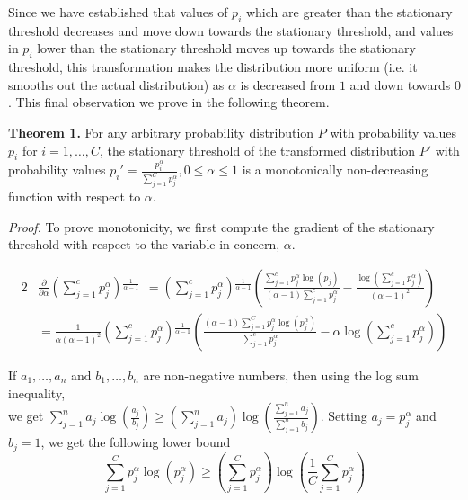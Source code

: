 \documentclass[times,sort&compress]{elsarticle}
\begin{document}
Since we have established that values of $p_i$ which are greater than the stationary
threshold decreases and move down towards the stationary threshold, and values in $p_i$
lower than the stationary threshold moves up towards the stationary threshold, this
transformation makes the distribution more uniform (i.e. it smooths out the actual
distribution) as $\alpha$ is decreased from $1$ and down towards $0$. This final
observation we prove in the following theorem.



\textbf{Theorem 1.} For any arbitrary probability distribution $P$ with probability
values $p_i$ for $i=1,\dots,C$, the stationary threshold of the transformed distribution
$P'$ with probability values $p_i'=\frac{p_i^{\alpha}}{\sum _{j=1}^C p_j^\alpha}, 0 \leq
\alpha \leq 1$ is a monotonically non-decreasing function with respect to $\alpha$.

\textit{Proof.} To prove monotonicity, we first compute the gradient of the stationary
threshold with respect to the variable in concern, $\alpha$.

\begin{alignat}{2} & \frac{\partial }{\partial \alpha} \left(\sum _{j=1}^c
p_j^{\alpha}\right){}^{\frac{1}{\alpha -1}}\ \ = \left(\sum _{j=1}^c
p_j^{\alpha}\right){}^{\frac{1}{\alpha -1}} \left(\frac{\sum _{j=1}^c p_j^{\alpha } \log
\left(p_j\right)}{(\alpha -1) \sum _{j=1}^c p_j^{\alpha}}-\frac{\log \left(\sum _{j=1}^c
p_j^{\alpha}\right)}{(\alpha -1)^2}\right) \\
& = \frac{1}{\alpha  (\alpha -1)^2} \left(\sum _{j=1}^c p_j^{\alpha
}\right){}^{\frac{1}{\alpha -1}} \left(\frac{(\alpha -1) \sum _{j=1}^C p_j^{\alpha }
\log \left(p_j^{\alpha}\right)}{\sum _{j=1}^c p_j^{\alpha }}-\alpha \log \left(\sum
_{j=1}^c p_j^{\alpha }\right)\right) \label{derivative} \end{alignat}

If $a_1,\dots ,a_n$ and $b_1,\dots ,b_n$ are non-negative numbers, then using the log
sum inequality, \\ we get $\sum _{j=1}^n a_j \log \left(\frac{a_j}{b_j}\right)\geq
\left(\sum _{j=1}^n a_j\right) \log \left(\frac{\sum _{j=1}^n a_j}{\sum _{j=1}^n
b_j}\right)$. Setting $a_j=p_j^\alpha$ and $b_j=1$, we get the following lower bound
\begin{equation} \sum _{j=1}^C p_j^{\alpha } \log
\left(p_j^{\alpha }\right)\geq \left(\sum _{j=1}^C
p_j^{\alpha}\right) \log \left(\frac{1}{C} \sum _{j=1}^C
p_j^{\alpha}\right) \label{lower_bound1} \end{equation}
\end{document}

